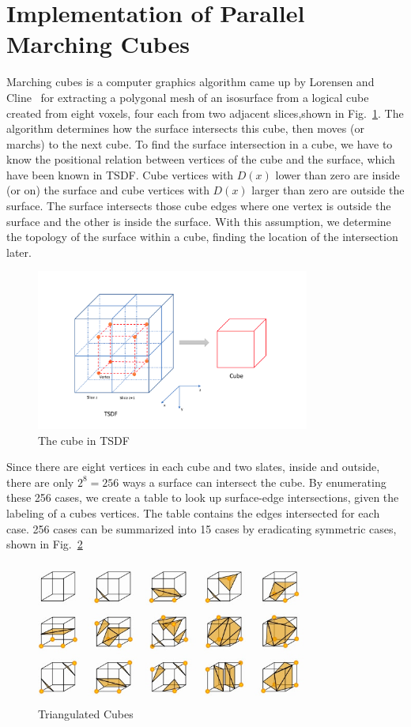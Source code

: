\documentclass{article}
\begin{document}
\section{Implementation of Parallel Marching Cubes}

Marching cubes is a computer graphics algorithm came up by Lorensen and Cline~\cite{Lorensen:1987:MCH:37402.37422} for extracting a polygonal mesh of an isosurface from a logical cube created from eight voxels, four each from two adjacent slices,shown in Fig.~\ref{fig:tsdf_mc}. The algorithm determines how the surface intersects this cube, then moves (or marchs) to the next cube. To find the surface intersection in a cube, we have to know the positional relation between vertices of the cube and the surface, which have been known in TSDF. Cube vertices with $D{(x)}$ lower than zero are inside (or on) the surface and cube vertices with  $D{(x)}$ larger than zero are outside the surface. The surface intersects those cube edges where one vertex is outside the surface and the other is inside the surface. With this assumption, we determine the topology of the surface within a cube, finding the location of the intersection later. 

\begin{figure}[h]
\centering
\includegraphics[width=9cm]{figures/TSDF_MC.png}
\caption{The cube in TSDF}
\label{fig:tsdf_mc}
\end{figure}

Since there are eight vertices in each cube and two slates, inside and outside, there are only $2^8 = 256$ ways a surface can intersect the cube. By enumerating these 256 cases, we create a table to look up surface-edge intersections, given the labeling of a cubes vertices. The table contains the edges intersected for each case. 256 cases can be summarized into 15 cases by eradicating symmetric cases, shown in Fig.~\ref{fig:triangulation}

\begin{figure}[h]
\centering
\includegraphics[width=9cm]{figures/mc.jpg}
\caption{Triangulated Cubes}
\label{fig:triangulation}
\end{figure}
\end{document}
